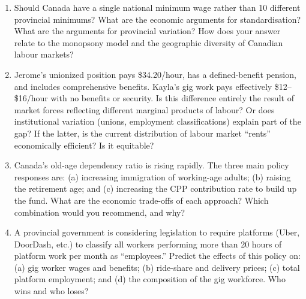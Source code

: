 \begin{enumerate}

\item Should Canada have a single national minimum wage rather than
10 different provincial minimums? What are the economic arguments for
standardisation? What are the arguments for provincial variation? How
does your answer relate to the monopsony model and the geographic
diversity of Canadian labour markets?

\item Jerome's unionized position pays \$34.20/hour, has a defined-benefit
pension, and includes comprehensive benefits. Kayla's gig work pays
effectively \$12--\$16/hour with no benefits or security. Is this
difference entirely the result of market forces reflecting different
marginal products of labour? Or does institutional variation (unions,
employment classifications) explain part of the gap? If the latter,
is the current distribution of labour market ``rents'' economically
efficient? Is it equitable?

\item Canada's old-age dependency ratio is rising rapidly. The three
main policy responses are: (a) increasing immigration of working-age
adults; (b) raising the retirement age; and (c) increasing the CPP
contribution rate to build up the fund. What are the economic trade-offs
of each approach? Which combination would you recommend, and why?

\item A provincial government is considering legislation to require
platforms (Uber, DoorDash, etc.) to classify all workers performing
more than 20 hours of platform work per month as ``employees.'' Predict
the effects of this policy on: (a) gig worker wages and benefits;
(b) ride-share and delivery prices; (c) total platform employment;
and (d) the composition of the gig workforce. Who wins and who loses?

\end{enumerate}
